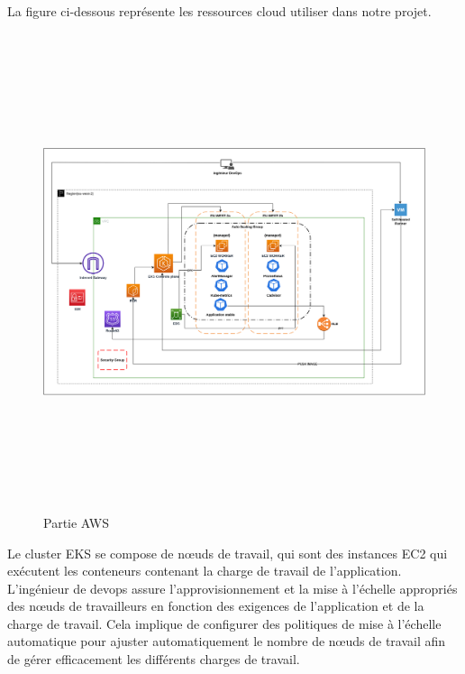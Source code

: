  
 \\
La figure ci-dessous représente les ressources cloud utiliser dans notre projet.
\begin{figure}[H]


  \includegraphics[width=18cm,height=14cm]{PARTIEEKS.drawio.png}
  
    \caption{Partie AWS}
  \end{figure}
  \indent
 Le cluster EKS se compose de nœuds de travail, qui sont des instances EC2 qui exécutent les conteneurs contenant la charge de travail de l’application. L’ingénieur de devops assure l’approvisionnement et la mise à l’échelle appropriés des nœuds de travailleurs en fonction des exigences de l’application et de la charge de travail. Cela implique de configurer des politiques de mise à l’échelle automatique pour ajuster automatiquement le nombre de nœuds de travail afin de gérer efficacement les différents charges de travail.
 \\[0.01cm]
 \indent
